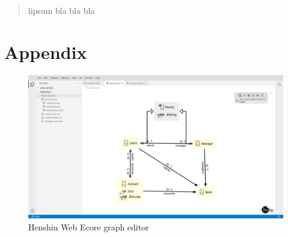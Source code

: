 \documentclass[conference,onecolumn]{IEEEtran}
\begin{document}
  

  \newpage

  \begin{abstract}
  lipsum bla bla bla
  \end{abstract}


  \IEEEpeerreviewmaketitle

    \newpage

 \tableofcontents
  \newpage

  

  

  

  

  

  

  

  

  

  

  \section{Appendix}
  \label{sec:appendix}

  \begin{figure}[H]
    \centering
    \includegraphics[width=1\textwidth]{ecore-ui}
    \caption{Henshin Web Ecore graph editor}
    \label{fig:ecore-ui}
  \end{figure}
\end{document}
